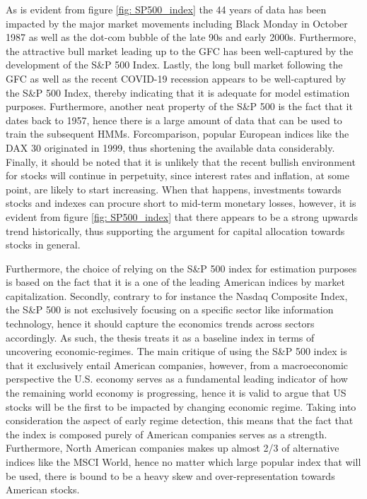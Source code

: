 As is evident from figure \ref{fig: SP500_index} the 44 years of data has been impacted by the major market movements including Black Monday in October 1987 as well as the dot-com bubble of the late 90s and early 2000s. Furthermore, the attractive bull market leading up to the GFC has been well-captured by the development of the S\&P 500 Index. Lastly, the long bull market following the GFC as well as the recent COVID-19 recession appears to be well-captured by the S\&P 500 Index, thereby indicating that it is adequate for model estimation purposes. Furthermore, another neat property of the S\&P 500 is the fact that it dates back to 1957, hence there is a large amount of data that can be used to train the subsequent HMMs. Forcomparison, popular European indices like the DAX 30 originated in 1999, thus shortening the available data considerably. Finally, it should be noted that it is unlikely that the recent bullish environment for stocks will continue in perpetuity, since interest rates and inflation, at some point, are likely to start increasing. When that happens, investments towards stocks and indexes can procure short to mid-term monetary losses, however, it is evident from figure \ref{fig: SP500_index} that there appears to be a strong upwards trend historically, thus supporting the argument for capital allocation towards stocks in general.

Furthermore, the choice of relying on the S\&P 500 index for estimation purposes is based on the fact that it is a one of the leading American indices by market capitalization. Secondly, contrary to for instance the Nasdaq Composite Index, the S\&P 500 is not exclusively focusing on a specific sector like information technology, hence it should capture the economics trends across sectors accordingly. As such, the thesis treats it as a baseline index in terms of uncovering economic-regimes. The main critique of using the S\&P 500 index is that it exclusively entail American companies, however, from a macroeconomic perspective the U.S. economy serves as a fundamental leading indicator of how the remaining world economy is progressing, hence it is valid to argue that US stocks will be the first to be impacted by changing economic regime. Taking into consideration the aspect of early regime detection, this means that the fact that the index is composed purely of American companies serves as a strength. Furthermore, North American companies makes up almost 2/3 of alternative indices like the MSCI World, hence no matter which large popular index that will be used, there is bound to be a heavy skew and over-representation towards American stocks.

